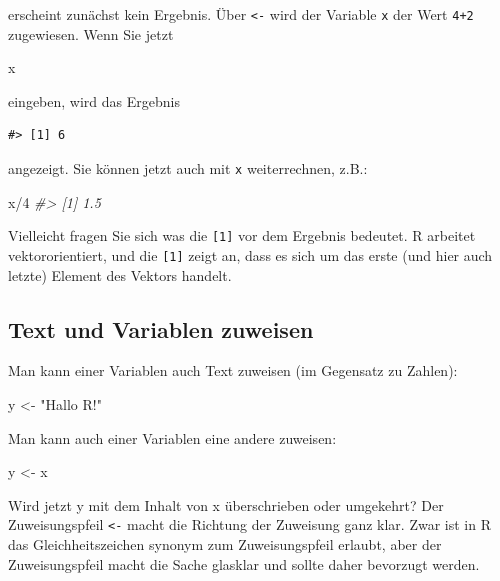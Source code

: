 \documentclass[12pt,ngerman,]{book}
\makeatletter
\newenvironment{Shaded}{\begin{snugshade}}{\end{snugshade}}
\newcommand{\DecValTok}[1]{\textcolor[rgb]{0.00,0.00,0.81}{{#1}}}
\newcommand{\StringTok}[1]{\textcolor[rgb]{0.31,0.60,0.02}{{#1}}}
\newcommand{\CommentTok}[1]{\textcolor[rgb]{0.56,0.35,0.01}{\textit{{#1}}}}
\newcommand{\NormalTok}[1]{{#1}}
\newenvironment{kframe}{%
\medskip{}
\setlength{\fboxsep}{.8em}
 \def\at@end@of@kframe{}%
 \ifinner\ifhmode%
  \def\at@end@of@kframe{\end{minipage}}%
  \begin{minipage}{\columnwidth}%
 \fi\fi%
 \def\FrameCommand##1{\hskip\@totalleftmargin \hskip-\fboxsep
 \colorbox{shadecolor}{##1}\hskip-\fboxsep
     \hskip-\linewidth \hskip-\@totalleftmargin \hskip\columnwidth}%
 \MakeFramed {\advance\hsize-\width
   \@totalleftmargin\z@ \linewidth\hsize
   \@setminipage}}%
 {\par\unskip\endMakeFramed%
 \at@end@of@kframe}
\renewenvironment{Shaded}{\begin{kframe}}{\end{kframe}}
\theoremstyle{definition}
\theoremstyle{definition}
\theoremstyle{remark}
\makeatother
\begin{document}
erscheint zunächst kein Ergebnis. Über \texttt{\textless{}-} wird der
Variable \texttt{x} der Wert \texttt{4+2} zugewiesen. Wenn Sie jetzt

\begin{Shaded}
\begin{Highlighting}[]
\NormalTok{x }
\end{Highlighting}
\end{Shaded}

eingeben, wird das Ergebnis

\begin{verbatim}
#> [1] 6
\end{verbatim}

angezeigt. Sie können jetzt auch mit \texttt{x} weiterrechnen, z.B.:

\begin{Shaded}
\begin{Highlighting}[]
\NormalTok{x/}\DecValTok{4} 
\CommentTok{#> [1] 1.5}
\end{Highlighting}
\end{Shaded}

Vielleicht fragen Sie sich was die \texttt{{[}1{]}} vor dem Ergebnis
bedeutet. R arbeitet vektororientiert, und die \texttt{{[}1{]}} zeigt
an, dass es sich um das erste (und hier auch letzte) Element des Vektors
handelt.

\subsection{Text und Variablen
zuweisen}\label{text-und-variablen-zuweisen}

Man kann einer Variablen auch Text zuweisen (im Gegensatz zu Zahlen):

\begin{Shaded}
\begin{Highlighting}[]
\NormalTok{y <-}\StringTok{ "Hallo R!"}
\end{Highlighting}
\end{Shaded}

Man kann auch einer Variablen eine andere zuweisen:

\begin{Shaded}
\begin{Highlighting}[]
\NormalTok{y <-}\StringTok{ }\NormalTok{x}
\end{Highlighting}
\end{Shaded}

Wird jetzt y mit dem Inhalt von x überschrieben oder umgekehrt? Der
Zuweisungspfeil \texttt{\textless{}-} macht die Richtung der Zuweisung
ganz klar. Zwar ist in R das Gleichheitszeichen synonym zum
Zuweisungspfeil erlaubt, aber der Zuweisungspfeil macht die Sache
glasklar und sollte daher bevorzugt werden.
\end{document}
